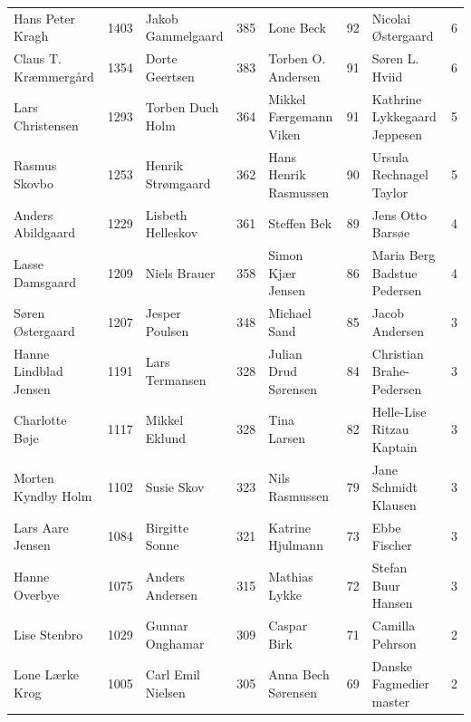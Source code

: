 \begin{table}[h]
\begin{tabular}{l|c|l|c|l|c|l|c}
		Hans Peter Kragh      &  1403  & Jakob Gammelgaard          &  385   & Lone Beck                    &   92   & Nicolai Østergaard           &   6    \\
		Claus T. Kræmmergård  &  1354  & Dorte Geertsen             &  383   & Torben O. Andersen           &   91   & Søren L. Hviid               &   6    \\
		Lars Christensen      &  1293  & Torben Duch Holm           &  364   & Mikkel Færgemann Viken       &   91   & Kathrine Lykkegaard Jeppesen &   5    \\
		Rasmus Skovbo         &  1253  & Henrik Strømgaard          &  362   & Hans Henrik Rasmussen        &   90   & Ursula Rechnagel Taylor      &   5    \\
		Anders Abildgaard     &  1229  & Lisbeth Helleskov          &  361   & Steffen Bek                  &   89   & Jens Otto Barsøe             &   4    \\
		Lasse Damsgaard       &  1209  & Niels Brauer               &  358   & Simon Kjær Jensen            &   86   & Maria Berg Badstue Pedersen  &   4    \\
		Søren Østergaard      &  1207  & Jesper Poulsen             &  348   & Michael Sand                 &   85   & Jacob Andersen               &   3    \\
		Hanne Lindblad Jensen &  1191  & Lars Termansen             &  328   & Julian Drud Sørensen         &   84   & Christian Brahe-Pedersen     &   3    \\
		Charlotte Bøje        &  1117  & Mikkel Eklund              &  328   & Tina Larsen                  &   82   & Helle-Lise Ritzau Kaptain    &   3    \\
		Morten Kyndby Holm    &  1102  & Susie Skov                 &  323   & Nils Rasmussen               &   79   & Jane Schmidt Klausen         &   3    \\
		Lars Aare Jensen      &  1084  & Birgitte Sonne             &  321   & Katrine Hjulmann             &   73   & Ebbe Fischer                 &   3    \\
		Hanne Overbye         &  1075  & Anders Andersen            &  315   & Mathias Lykke                &   72   & Stefan Buur Hansen           &   3    \\
		Lise Stenbro          &  1029  & Gunnar Onghamar            &  309   & Caspar Birk                  &   71   & Camilla Pehrson              &   2    \\
		Lone Lærke Krog       &  1005  & Carl Emil Nielsen          &  305   & Anna Bech Sørensen           &   69   & Danske Fagmedier master      &   2    \\

\end{tabular}
\end{table}
